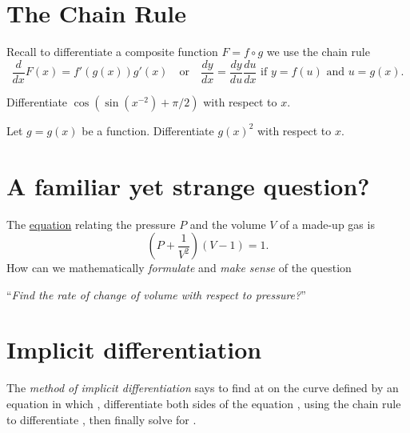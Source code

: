 \documentclass[../main.tex]{subfiles}
\begin{document}

\section{The Chain Rule}
Recall to differentiate a composite function \(F = f \circ g\) we use the chain rule
\[
  \frac{d}{dx} F(x) = f'( g(x) ) g'(x) \quad\text{or}\quad \frac{dy}{dx} = \frac{dy}{du} \frac{du}{dx} \text{ if } y = f(u) \text{ and } u = g(x).
\]

\begin{example}
  Differentiate \(\cos(\sin(x^{-2}) + \pi/2)\) with respect to \(x\).
\end{example}

\clearpage

\begin{example}
  Let \(g = g(x)\) be a function. Differentiate \(g(x)^{2}\) with respect to \(x\).
\end{example}
\vspace{2in}

\section{A familiar yet strange question?}
The \href{https://www.wolframalpha.com/input?i=implicit+plot+%28P+%2B+1%2FV%5E2%29%28V+-+1%29+%3D+1}{equation} relating the pressure \(P\) and the volume \(V\) of a made-up gas is
\[
  \left( P + \frac{1}{V^{2}} \right)(V - 1) = 1.
\]
How can we mathematically \emph{formulate} and \emph{make sense} of the question 
\begin{center}
  ``\emph{Find the rate of change of volume with respect to pressure?}''
\end{center}
\clearpage

\section{Implicit differentiation}
\vspace{1in}
\begin{mdframed}[style=simple]
  The \emph{method of implicit differentiation} says to find  at  on the curve defined by an equation in which , differentiate both sides of the equation , using the chain rule to differentiate , then finally solve for .
\end{mdframed}
\vspace{2in}
\end{document}
